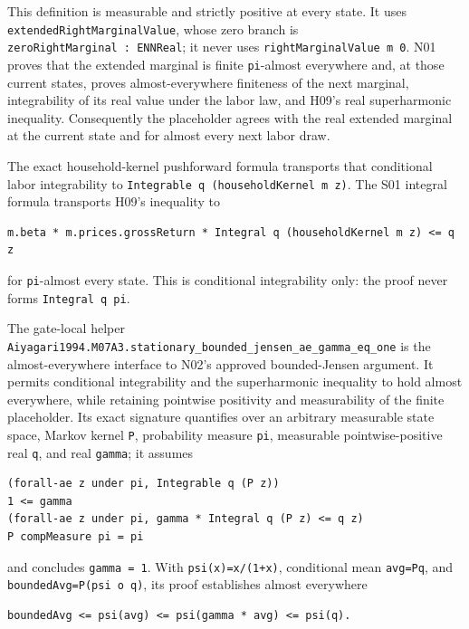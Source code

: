 \documentclass[
  11pt,
]{article}
\let\LedgerOriginalTexttt\texttt
\renewcommand{\texttt}[1]{{\small\LedgerOriginalTexttt{#1}}}
\begin{document}
This definition is measurable and strictly positive at every state. It
uses \texttt{extendedRightMarginalValue}, whose zero branch is
\texttt{zeroRightMarginal\ :\ ENNReal}; it never uses
\texttt{rightMarginalValue\ m\ 0}. N01 proves that the extended marginal
is finite \texttt{pi}-almost everywhere and, at those current states,
proves almost-everywhere finiteness of the next marginal, integrability
of its real value under the labor law, and H09's real superharmonic
inequality. Consequently the placeholder agrees with the real extended
marginal at the current state and for almost every next labor draw.

The exact household-kernel pushforward formula transports that
conditional labor integrability to
\texttt{Integrable\ q\ (householdKernel\ m\ z)}. The S01 integral
formula transports H09's inequality to

\begin{verbatim}
m.beta * m.prices.grossReturn * Integral q (householdKernel m z) <= q z
\end{verbatim}

for \texttt{pi}-almost every state. This is conditional integrability
only: the proof never forms \texttt{Integral\ q\ pi}.

The gate-local helper
\texttt{Aiyagari1994.M07A3.stationary\_bounded\_jensen\_ae\_gamma\_eq\_one}
is the almost-everywhere interface to N02's approved bounded-Jensen
argument. It permits conditional integrability and the superharmonic
inequality to hold almost everywhere, while retaining pointwise
positivity and measurability of the finite placeholder. Its exact
signature quantifies over an arbitrary measurable state space, Markov
kernel \texttt{P}, probability measure \texttt{pi}, measurable
pointwise-positive real \texttt{q}, and real \texttt{gamma}; it assumes

\begin{verbatim}
(forall-ae z under pi, Integrable q (P z))
1 <= gamma
(forall-ae z under pi, gamma * Integral q (P z) <= q z)
P compMeasure pi = pi
\end{verbatim}

and concludes \texttt{gamma\ =\ 1}. With \texttt{psi(x)=x/(1+x)},
conditional mean \texttt{avg=Pq}, and \texttt{boundedAvg=P(psi\ o\ q)},
its proof establishes almost everywhere

\begin{verbatim}
boundedAvg <= psi(avg) <= psi(gamma * avg) <= psi(q).
\end{verbatim}
\end{document}
